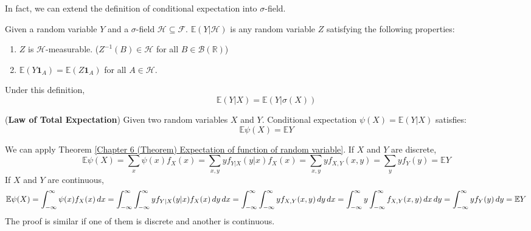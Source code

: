 \documentclass{huhtakm-template-book}
\newcommand{\expect}{\mathbb{E}}
\begin{document}
In fact, we can extend the definition of conditional expectation into $\sigma$-field.
\begin{defn}
	Given a random variable $Y$ and a $\sigma$-field $\mathcal{H}\subseteq\mathcal{F}$. $\expect(Y|\mathcal{H})$ is any random variable $Z$ satisfying the following properties:
	\begin{enumerate}
		\item $Z$ is $\mathcal{H}$-measurable. ($Z^{-1}(B)\in\mathcal{H}$ for all $B\in\mathcal{B}(\mathbb{R})$)
		\item $\expect(Y\mathbf{1}_{A})=\expect(Z\mathbf{1}_{A})$ for all $A\in\mathcal{H}$.
	\end{enumerate}
\end{defn}
\begin{rem}
	Under this definition,
	\begin{equation*}
		\expect(Y|X)=\expect(Y|\sigma(X))
	\end{equation*}
\end{rem}
\begin{thm}(\textbf{Law of Total Expectation})
	\label{Chapter 6 (Theorem) Law of total expectation}
	Given two random variables $X$ and $Y$. Conditional expectation $\psi(X)=\expect(Y|X)$ satisfies:
	\begin{equation*}
		\expect{\psi(X)}=\expect{Y}
	\end{equation*}
\end{thm}
\begin{proofing}
	We can apply Theorem \ref{Chapter 6 (Theorem) Expectation of function of random variable}. If $X$ and $Y$ are discrete, 
	\begin{equation*}
		\expect{\psi(X)}=\sum_{x}\psi(x)f_{X}(x)=\sum_{x,y}yf_{Y|X}(y|x)f_{X}(x)=\sum_{x,y}yf_{X,Y}(x,y)=\sum_{y}yf_{Y}(y)=\expect{Y}
	\end{equation*}
	If $X$ and $Y$ are continuous,
	\begin{equation*}
		\expect{\psi(X)}=\intinfty\psi(x)f_{X}(x)\,dx=\intinfty\intinfty yf_{Y|X}(y|x)f_{X}(x)\,dy\,dx=\intinfty\intinfty yf_{X,Y}(x,y)\,dy\,dx=\intinfty y\intinfty f_{X,Y}(x,y)\,dx\,dy=\intinfty yf_{Y}(y)\,dy=\expect{Y}
	\end{equation*}
	The proof is similar if one of them is discrete and another is continuous.
\end{proofing}
\end{document}
